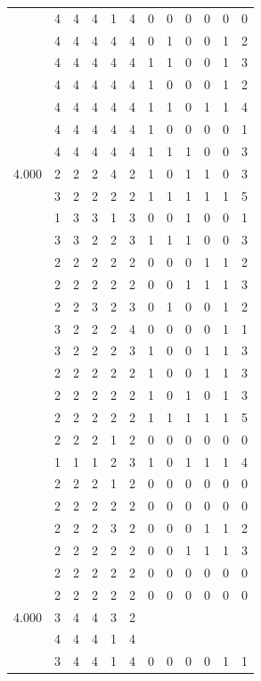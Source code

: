 \documentclass[]{msu-thesis}
\theoremstyle{definition}
\theoremstyle{definition}
\theoremstyle{definition}
\theoremstyle{remark}
\begin{document}
\begin{table}
{\begin{tabular}[t]{rrrrrrrrrrrr}
 & 4 & 4 & 4 & 1 & 4 & 0 & 0 & 0 & 0 & 0 & 0\\
 & 4 & 4 & 4 & 4 & 4 & 0 & 1 & 0 & 0 & 1 & 2\\
 & 4 & 4 & 4 & 4 & 4 & 1 & 1 & 0 & 0 & 1 & 3\\
 & 4 & 4 & 4 & 4 & 4 & 1 & 0 & 0 & 0 & 1 & 2\\
 & 4 & 4 & 4 & 4 & 4 & 1 & 1 & 0 & 1 & 1 & 4\\
 & 4 & 4 & 4 & 4 & 4 & 1 & 0 & 0 & 0 & 0 & 1\\
 & 4 & 4 & 4 & 4 & 4 & 1 & 1 & 1 & 0 & 0 & 3\\
4.000 & 2 & 2 & 2 & 4 & 2 & 1 & 0 & 1 & 1 & 0 & 3\\
 & 3 & 2 & 2 & 2 & 2 & 1 & 1 & 1 & 1 & 1 & 5\\
 & 1 & 3 & 3 & 1 & 3 & 0 & 0 & 1 & 0 & 0 & 1\\
 & 3 & 3 & 2 & 2 & 3 & 1 & 1 & 1 & 0 & 0 & 3\\
 & 2 & 2 & 2 & 2 & 2 & 0 & 0 & 0 & 1 & 1 & 2\\
 & 2 & 2 & 2 & 2 & 2 & 0 & 0 & 1 & 1 & 1 & 3\\
 & 2 & 2 & 3 & 2 & 3 & 0 & 1 & 0 & 0 & 1 & 2\\
 & 3 & 2 & 2 & 2 & 4 & 0 & 0 & 0 & 0 & 1 & 1\\
 & 3 & 2 & 2 & 2 & 3 & 1 & 0 & 0 & 1 & 1 & 3\\
 & 2 & 2 & 2 & 2 & 2 & 1 & 0 & 0 & 1 & 1 & 3\\
 & 2 & 2 & 2 & 2 & 2 & 1 & 0 & 1 & 0 & 1 & 3\\
 & 2 & 2 & 2 & 2 & 2 & 1 & 1 & 1 & 1 & 1 & 5\\
 & 2 & 2 & 2 & 1 & 2 & 0 & 0 & 0 & 0 & 0 & 0\\
 & 1 & 1 & 1 & 2 & 3 & 1 & 0 & 1 & 1 & 1 & 4\\
 & 2 & 2 & 2 & 1 & 2 & 0 & 0 & 0 & 0 & 0 & 0\\
 & 2 & 2 & 2 & 2 & 2 & 0 & 0 & 0 & 0 & 0 & 0\\
 & 2 & 2 & 2 & 3 & 2 & 0 & 0 & 0 & 1 & 1 & 2\\
 & 2 & 2 & 2 & 2 & 2 & 0 & 0 & 1 & 1 & 1 & 3\\
 & 2 & 2 & 2 & 2 & 2 & 0 & 0 & 0 & 0 & 0 & 0\\
 & 2 & 2 & 2 & 2 & 2 & 0 & 0 & 0 & 0 & 0 & 0\\
4.000 & 3 & 4 & 4 & 3 & 2 &  &  &  &  &  & \\
 & 4 & 4 & 4 & 1 & 4 &  &  &  &  &  & \\
 & 3 & 4 & 4 & 1 & 4 & 0 & 0 & 0 & 0 & 1 & 1\\

\end{tabular}}
\end{table}
\end{document}
